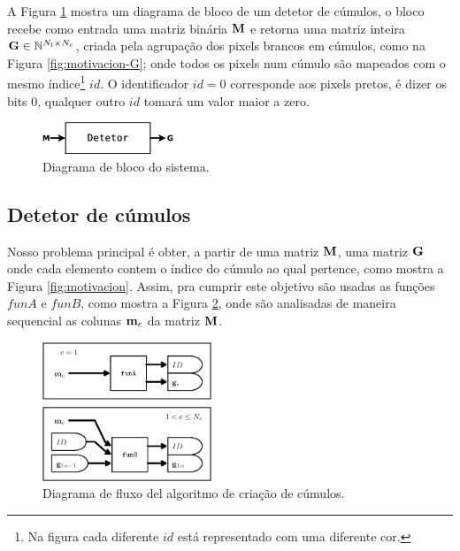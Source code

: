 A Figura \ref{fig:Diagrama} mostra um diagrama de bloco de um detetor de cúmulos,
o bloco recebe como entrada uma matriz binária $\MATRIX{M}$ e 
retorna uma matriz inteira $\MATRIX{G}\in \mathbb{N}^{N_l \times N_c}$, 
criada pela agrupação dos pixels brancos em cúmulos, como na Figura \ref{fig:motivacion-G}; onde 
todos os pixels num cúmulo são mapeados com o mesmo índice\footnote{Na 
figura cada diferente $id$ está representado com uma diferente cor.} 
$id$. %
O identificador $id=0$ corresponde aos pixels pretos, é dizer os bits 0,
qualquer outro $id$ tomará um valor maior a zero.

\begin{figure}[!htb]
\centering
\includegraphics[width=0.35\textwidth]{section-cumulos/Diagrama.eps}
\caption{Diagrama de bloco do sistema.}
\label{fig:Diagrama}
\end{figure}



\subsection{Detetor de cúmulos}
\label{subsec:part1}

Nosso problema principal é obter, a partir de uma matriz $\MATRIX{M}$, 
 uma matriz $\MATRIX{G}$ onde cada elemento contem
o índice do cúmulo ao qual pertence, como mostra a Figura \ref{fig:motivacion}.
Assim, pra cumprir este objetivo são usadas as funções $funA$ e $funB$, como mostra  a
Figura \ref{fig:modelocumulos}, onde são analisadas de maneira sequencial as colunas $\VECTOR{M}_c$ da
matriz $\MATRIX{M}$.
\begin{figure}[!htb]
\centering
\includegraphics[width=0.45\textwidth]{section-cumulos/DiagramaCompleto.eps}
\caption{Diagrama de fluxo del algoritmo de criação de cúmulos.}
\label{fig:modelocumulos}
\end{figure}

